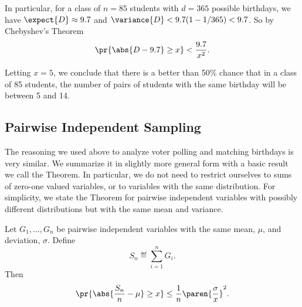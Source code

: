 In particular, for a class of $n= 85$ students with $d=365$ possible
birthdays, we have $\expect{D} \approx 9.7$ and $\variance{D} < 9.7 (1-
1/365) < 9.7$.  So by Chebyshev's Theorem
\[
\pr{\abs{D - 9.7} \geq x} < \frac{9.7}{x^2}.
\]

Letting $x=5$, we conclude that there is a better than 50\% chance that in
a class of 85 students, the number of pairs of students with the same
birthday will be between 5 and 14.



\subsection{Pairwise Independent Sampling}\label{sec:pairwise_ind_samp}

The reasoning we used above to analyze voter polling and matching
birthdays is very similar.  We summarize it in slightly more general form
with a basic result we call the 
Theorem.  In particular, we do not need to restrict ourselves to sums of
zero-one valued variables, or to variables with the same distribution.
For simplicity, we state the Theorem for pairwise independent variables
with possibly different distributions but with the same mean and variance.

\begin{theorem}\label{th:pairwise-sampling}
Let $G_1, \dots, G_n$ be pairwise independent variables with the same
mean, $\mu$, and deviation, $\sigma$.  Define
\begin{equation}\label{ln14.Sn}
S_n \eqdef \sum_{i=1}^n G_i.
\end{equation}
Then
\[
\pr{\abs{\frac{S_n}{n} - \mu} \geq x}
    \leq \frac{1}{n} \paren{\frac{\sigma}{x}}^2.
\]
\end{theorem}

